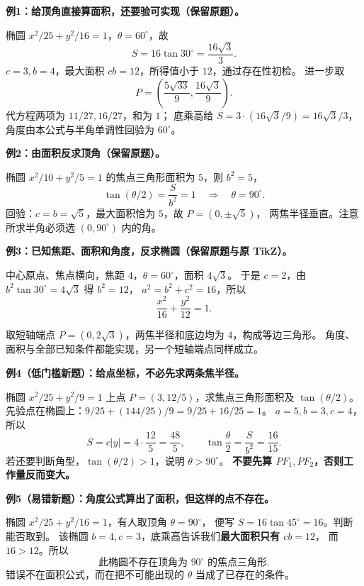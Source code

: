 \begin{examplebox}
\textbf{例1：给顶角直接算面积，还要验可实现（保留原题）。}

椭圆 $x^2/25+y^2/16=1$，$\theta=60^\circ$，故
\[
 \boxed{S=16\tan30^\circ=\frac{16\sqrt3}{3}}.
\]
$c=3,b=4$，最大面积 $cb=12$，所得值小于 $12$，通过存在性初检。
进一步取
\[
 P=\left(\frac{5\sqrt{33}}9,\frac{16\sqrt3}9\right).
\]
代方程两项为 $11/27,16/27$，和为 $1$；
底乘高给 $S=3\cdot(16\sqrt3/9)=16\sqrt3/3$，
角度由本公式与半角单调性回验为 $60^\circ$。

\medskip
\textbf{例2：由面积反求顶角（保留原题）。}

椭圆 $x^2/10+y^2/5=1$ 的焦点三角形面积为 $5$，则 $b^2=5$，
\[
 \tan(\theta/2)=\frac{S}{b^2}=1
 \quad\Longrightarrow\quad\boxed{\theta=90^\circ}.
\]
回验：$c=b=\sqrt5$，最大面积恰为 $5$，故 $P=(0,\pm\sqrt5)$，
两焦半径垂直。注意所求半角必须选 $(0,90^\circ)$ 内的角。

\medskip
\textbf{例3：已知焦距、面积和角度，反求椭圆（保留原题与原 TikZ）。}

中心原点、焦点横向，焦距 $4$，$\theta=60^\circ$，面积 $4\sqrt3$。
于是 $c=2$，由 $b^2\tan30^\circ=4\sqrt3$ 得 $b^2=12$，
$a^2=b^2+c^2=16$，所以
\[
 \boxed{\frac{x^2}{16}+\frac{y^2}{12}=1}.
\]

取短轴端点 $P=(0,2\sqrt3)$，两焦半径和底边均为 $4$，构成等边三角形。
角度、面积与全部已知条件都能实现，另一个短轴端点同样成立。

\medskip
\textbf{例4（低门槛新题）：给点坐标，不必先求两条焦半径。}

椭圆 $x^2/25+y^2/9=1$ 上点 $P=(3,12/5)$，求焦点三角形面积及 $\tan(\theta/2)$。
先验点在椭圆上：$9/25+(144/25)/9=9/25+16/25=1$。
$a=5,b=3,c=4$，所以
\[
 \boxed{S=c|y|=4\cdot\frac{12}{5}=\frac{48}{5}},\qquad
 \boxed{\tan\frac\theta2=\frac{S}{b^2}=\frac{16}{15}}.
\]
若还要判断角型，$\tan(\theta/2)>1$，说明 $\theta>90^\circ$。
\textbf{不要先算 $PF_1,PF_2$，否则工作量反而变大。}

\medskip
\textbf{例5（易错新题）：角度公式算出了面积，但这样的点不存在。}

椭圆 $x^2/25+y^2/16=1$，有人取顶角 $\theta=90^\circ$，
便写 $S=16\tan45^\circ=16$。判断能否取到。
该椭圆 $b=4,c=3$，底乘高告诉我们\textbf{最大面积只有 $cb=12$}，
而 $16>12$。所以
\[
 \boxed{\text{此椭圆不存在顶角为 }90^\circ\text{ 的焦点三角形}}.
\]
错误不在面积公式，而在把不可能出现的 $\theta$ 当成了已存在的条件。
\end{examplebox}
\clearpage
